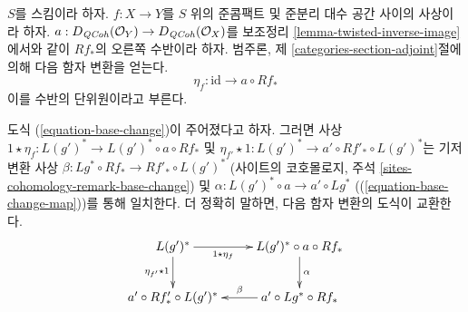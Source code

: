 \noindent
$S$를 스킴이라 하자.
$f : X \to Y$를 $S$ 위의 준콤팩트 및 준분리 대수 공간 사이의 사상이라
하자. $a : D_{\mathit{QCoh}}(\mathcal{O}_Y) \to D_{\mathit{QCoh}}(\mathcal{O}_X)$를
보조정리 \ref{lemma-twisted-inverse-image}에서와 같이 $Rf_*$의
오른쪽 수반이라 하자. 범주론, 제 \ref{categories-section-adjoint}절에
의해 다음 함자 변환을 얻는다.
$$
\eta_f : \text{id} \to  a \circ Rf_*
$$
이를 수반의 단위원이라고 부른다.

\begin{lemma}
\label{lemma-unit-and-base-change}
도식 (\ref{equation-base-change})이 주어졌다고 하자. 그러면 사상
$1 \star \eta_f : L(g')^* \to L(g')^* \circ a \circ Rf_*$ 및
$\eta_{f'} \star 1 : L(g')^* \to a' \circ Rf'_* \circ L(g')^*$는
기저 변환 사상
$\beta : Lg^* \circ Rf_* \to Rf'_* \circ L(g')^*$
(사이트의 코호몰로지, 주석
\ref{sites-cohomology-remark-base-change}) 및
$\alpha : L(g')^* \circ a \to a' \circ Lg^*$
((\ref{equation-base-change-map}))를 통해 일치한다.
더 정확히 말하면, 다음 함자 변환의 도식이 교환한다.
$$
\xymatrix{
L(g')^* \ar[r]_-{1 \star \eta_f} \ar[d]_{\eta_{f'} \star 1} &
L(g')^* \circ a \circ Rf_* \ar[d]^\alpha \\
a' \circ Rf'_* \circ L(g')^* &
a' \circ Lg^* \circ Rf_* \ar[l]_-\beta
}
$$
\end{lemma}

